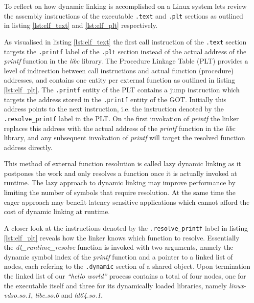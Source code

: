 To reflect on how dynamic linking is accomplished on a Linux system lets review the assembly instructions of the executable \texttt{.text} and \texttt{.plt} sections as outlined in listing \ref{lst:elf_text} and \ref{lst:elf_plt} respectively.





As visualised in listing \ref{lst:elf_text} the first call instruction of the \texttt{.text} section targets the \texttt{.printf} label of the \texttt{.plt} section instead of the actual address of the \textit{printf} function in the \textit{libc} library. The Procedure Linkage Table (PLT) provides a level of indirection between call instructions and actual function (procedure) addresses, and contains one entity per external function as outlined in listing \ref{lst:elf_plt}. The \texttt{.printf} entity of the PLT contains a jump instruction which targets the address stored in the \texttt{.printf} entity of the GOT. Initially this address points to the next instruction, i.e. the instruction denoted by the \texttt{.resolve\_printf} label in the PLT. On the first invokation of \textit{printf} the linker replaces this address with the actual address of the \textit{printf} function in the \textit{libc} library, and any subsequent invokation of \textit{printf} will target the resolved function address directly.

This method of external function resolution is called lazy dynamic linking as it postpones the work and only resolves a function once it is actually invoked at runtime. The lazy approach to dynamic linking may improve performance by limiting the number of symbols that require resolution. At the same time the eager approach may benefit latency sensitive applications which cannot afford the cost of dynamic linking at runtime.

A closer look at the instructions denoted by the \texttt{.resolve\_printf} label in listing \ref{lst:elf_plt} reveals how the linker knows which function to resolve. Essentially the \textit{dl\_runtime\_resolve} function is invoked with two arguments, namely the dynamic symbol index of the \textit{printf} function and a pointer to a linked list of nodes, each refering to the \texttt{.dynamic} section of a shared object. Upon termination the linked list of our \textit{``hello world''} process contains a total of four nodes, one for the executable itself and three for its dynamically loaded libraries, namely \textit{linux-vdso.so.1}, \textit{libc.so.6} and \textit{ld64.so.1}.

